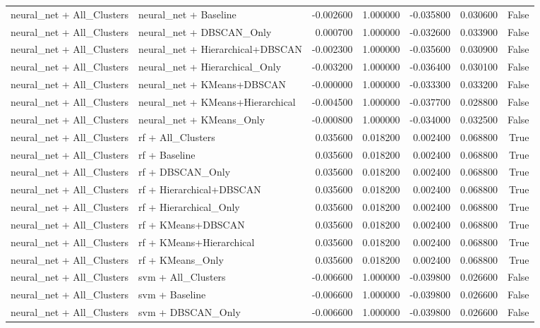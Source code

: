\begin{tabular}{llrrrrr}
neural_net + All_Clusters & neural_net + Baseline & -0.002600 & 1.000000 & -0.035800 & 0.030600 & False \\
neural_net + All_Clusters & neural_net + DBSCAN_Only & 0.000700 & 1.000000 & -0.032600 & 0.033900 & False \\
neural_net + All_Clusters & neural_net + Hierarchical+DBSCAN & -0.002300 & 1.000000 & -0.035600 & 0.030900 & False \\
neural_net + All_Clusters & neural_net + Hierarchical_Only & -0.003200 & 1.000000 & -0.036400 & 0.030100 & False \\
neural_net + All_Clusters & neural_net + KMeans+DBSCAN & -0.000000 & 1.000000 & -0.033300 & 0.033200 & False \\
neural_net + All_Clusters & neural_net + KMeans+Hierarchical & -0.004500 & 1.000000 & -0.037700 & 0.028800 & False \\
neural_net + All_Clusters & neural_net + KMeans_Only & -0.000800 & 1.000000 & -0.034000 & 0.032500 & False \\
neural_net + All_Clusters & rf + All_Clusters & 0.035600 & 0.018200 & 0.002400 & 0.068800 & True \\
neural_net + All_Clusters & rf + Baseline & 0.035600 & 0.018200 & 0.002400 & 0.068800 & True \\
neural_net + All_Clusters & rf + DBSCAN_Only & 0.035600 & 0.018200 & 0.002400 & 0.068800 & True \\
neural_net + All_Clusters & rf + Hierarchical+DBSCAN & 0.035600 & 0.018200 & 0.002400 & 0.068800 & True \\
neural_net + All_Clusters & rf + Hierarchical_Only & 0.035600 & 0.018200 & 0.002400 & 0.068800 & True \\
neural_net + All_Clusters & rf + KMeans+DBSCAN & 0.035600 & 0.018200 & 0.002400 & 0.068800 & True \\
neural_net + All_Clusters & rf + KMeans+Hierarchical & 0.035600 & 0.018200 & 0.002400 & 0.068800 & True \\
neural_net + All_Clusters & rf + KMeans_Only & 0.035600 & 0.018200 & 0.002400 & 0.068800 & True \\
neural_net + All_Clusters & svm + All_Clusters & -0.006600 & 1.000000 & -0.039800 & 0.026600 & False \\
neural_net + All_Clusters & svm + Baseline & -0.006600 & 1.000000 & -0.039800 & 0.026600 & False \\
neural_net + All_Clusters & svm + DBSCAN_Only & -0.006600 & 1.000000 & -0.039800 & 0.026600 & False \\

\end{tabular}
